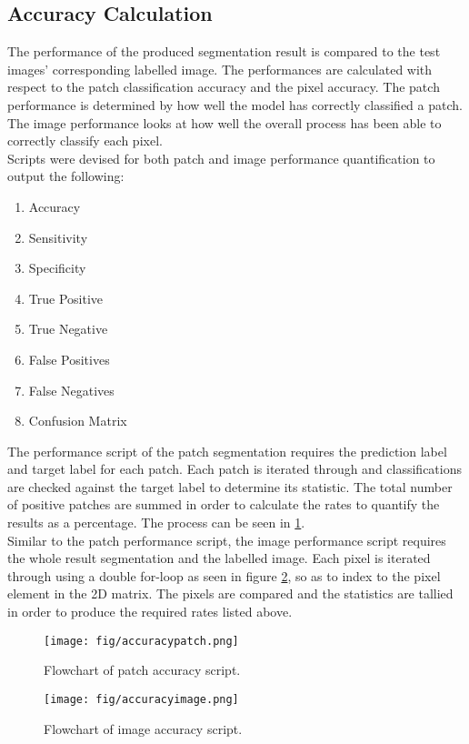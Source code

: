 \subsection{Accuracy Calculation}
The performance of the produced segmentation result is compared to the test images' corresponding labelled image. The performances are calculated with respect to the patch classification accuracy and the pixel accuracy. The patch performance is determined by how well the model has correctly classified a patch. The image performance looks at how well the overall process  has been able to correctly classify each pixel. 
\\[1\baselineskip]
Scripts were devised for both patch and image performance quantification to output the following:
\begin{enumerate}
	\item Accuracy
	\item Sensitivity
	\item Specificity
	\item True Positive
	\item True Negative
	\item False Positives
	\item False Negatives
	\item Confusion Matrix
\end{enumerate}
The performance script of the patch segmentation requires the prediction label and target label for each patch. Each patch is iterated through and classifications are checked against the target label to determine its statistic.  The total number of positive patches are summed in order to calculate the rates to quantify the results as a percentage. The process can be seen in \ref{fig: accuracypatch}.
\\[1\baselineskip]
Similar to the patch performance script, the image performance script requires the whole result segmentation and the labelled image. Each pixel is iterated through using a double for-loop as seen in figure \ref{fig: accuracyimage}, so as to index to the pixel element in the 2D matrix. The pixels are compared and the statistics are tallied in order to produce the required rates listed above.

\begin{figure}[H]
\centering
\texttt{[image: fig/accuracypatch.png]}
\caption{Flowchart of patch accuracy script.}
\label{fig: accuracypatch}
\end{figure}

\begin{figure}[H]
\centering
\texttt{[image: fig/accuracyimage.png]}
\caption{Flowchart of image accuracy script.}
\label{fig: accuracyimage}
\end{figure}

